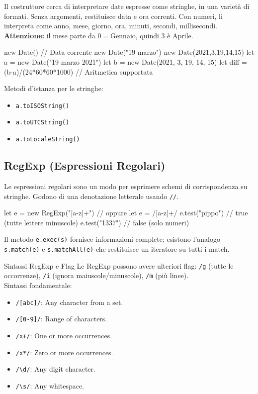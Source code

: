 Il costruttore cerca di interpretare date espresse come stringhe, in una varietà di formati. Senza argomenti, restituisce data e ora correnti. Con numeri, li interpreta come anno, mese, giorno, ora, minuti, secondi, millisecondi. \textbf{Attenzione:} il mese parte da $0 = \text{Gennaio}$, quindi 3 è Aprile.

\begin{jsbox}[title={Esempi Date}]
new Date() // Data corrente
new Date("19 marzo") 
new Date(2021,3,19,14,15) 
let a = new Date("19 marzo 2021")
let b = new Date(2021, 3, 19, 14, 15)
let diff = (b-a)/(24*60*60*1000) // Aritmetica supportata
\end{jsbox}

Metodi d'istanza per le stringhe:
\begin{itemize}
    \item \texttt{a.toISOString()} 
    \item \texttt{a.toUTCString()} 
    \item \texttt{a.toLocaleString()} 
\end{itemize}

\subsection{RegExp (Espressioni Regolari)}
Le espressioni regolari sono un modo per esprimere schemi di corrispondenza su stringhe. Godono di una denotazione letterale usando \texttt{//}.

\begin{jsbox}[title={RegExp}]
let e = new RegExp("[a-z]+") // oppure let e = /[a-z]+/
e.test("pippo") // true (tutte lettere minuscole)
e.test("1337") // false (solo numeri)
\end{jsbox}

Il metodo \texttt{e.exec(s)} fornisce informazioni complete; esistono l'analogo \texttt{s.match(e)} e \texttt{s.matchAll(e)} che restituisce un iteratore su tutti i match.

\begin{definition}{Sintassi RegExp e Flag}
Le RegExp possono avere ulteriori flag: \texttt{/g} (tutte le occorrenze), \texttt{/i} (ignora maiuscole/minuscole), \texttt{/m} (più linee).\\
Sintassi fondamentale:
\begin{itemize}
    \item \texttt{/[abc]/}: Any character from a set.
    \item \texttt{/[0-9]/}: Range of characters.
    \item \texttt{/x+/}: One or more occurrences.
    \item \texttt{/x*/}: Zero or more occurrences.
    \item \texttt{/\textbackslash d/}: Any digit character.
    \item \texttt{/\textbackslash s/}: Any whitespace.
\end{itemize}
\end{definition}

